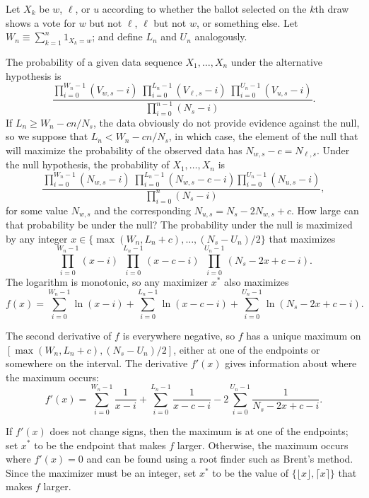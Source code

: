 \documentclass[runningheads]{llncs}
\begin{document}
Let $X_k$ be $w$, $\ell$, or $u$ according to whether the ballot selected on the $k$th draw 
shows a vote for $w$ but not $\ell$, $\ell$ but not $w$, or something else.
Let $W_n \equiv \sum_{k=1}^n 1_{X_k = w}$; and define $L_n$ and $U_n$ analogously.

The probability of a given data sequence $X_1, \ldots, X_n$ under the alternative hypothesis is
$$
    \frac{\prod_{i=0}^{W_n-1} (V_{w,s}-i) \; 
             \prod_{i=0}^{L_n-1} (V_{\ell,s}-i) \;
             \prod_{i=0}^{U_n-1} (V_{u,s}-i)}
            {\prod_{i=0}^{n-1} (N_s-i)}.
$$
If $L_n \ge W_n - cn/N_s$, the data obviously do not provide evidence against the null, so we suppose that
$L_n < W_n - cn/N_s$, in which case, the element of the null that will maximize the probability of the observed data has $N_{w,s} - c = N_{\ell,s}$.
Under the null hypothesis, the probability of $X_1, \ldots, X_n$ is
$$
    \frac{ \prod_{i=0}^{W_n-1} (N_{w,s}-i) \;
             \prod_{i=0}^{L_n-1}(N_{w,s}-c - i)
             \prod_{i=0}^{U_n-1} (N_{u,s}-i)}
             {\prod_{i=0}^n (N_s-i)},
$$
for some value $N_{w,s}$ and the corresponding $N_{u,s} = N_s - 2N_{w,s}+c$.
How large can that probability be under the null? 
The probability under the null is maximized by any integer 
$x \in \{ \max(W_n, L_n+c), \ldots, (N_s-U_n)/2 \}$ that maximizes 
$$
\prod_{i=0}^{W_n-1} (x-i) \; \prod_{i=0}^{L_n-1} (x-c-i) \; \prod_{i=0}^{U_n-1} (N_s-2x+c - i).
$$
The logarithm is monotonic, so any maximizer $x^*$ also maximizes
$$ f(x) = \sum_{i=0}^{W_n-1} \ln (x-i) + \sum_{i=0}^{L_n-1} \ln (x-c-i) + \sum_{i=0}^{U_n-1} \ln (N_s-2x+ c - i).$$

The second derivative of $f$ is everywhere negative, so $f$ has a unique maximum on $[ \max(W_n, L_n+c), (N_s-U_n)/2]$,
either at one of the endpoints or somewhere on the interval.
The derivative $f'(x)$ gives information about where the maximum occurs:
$$ f'(x) = \sum_{i=0}^{W_n-1} \frac{1}{ x-i } + \sum_{i=0}^{L_n-1} \frac{1}{ x-c-i} -2 \sum_{i=0}^{U_n-1} \frac{1}{N_s-2x+ c - i}.$$

If $f'(x)$ does not change signs, then the maximum is at one of the endpoints;
set $x^*$ to be the endpoint that makes $f$ larger.
Otherwise, the maximum occurs where $f'(x) = 0$ and can be found using a root finder such as Brent's method.
Since the maximizer must be an integer, set $x^*$ to be the value of $\{\lfloor x \rfloor, \lceil x \rceil\}$ that makes $f$ larger.
\end{document}
